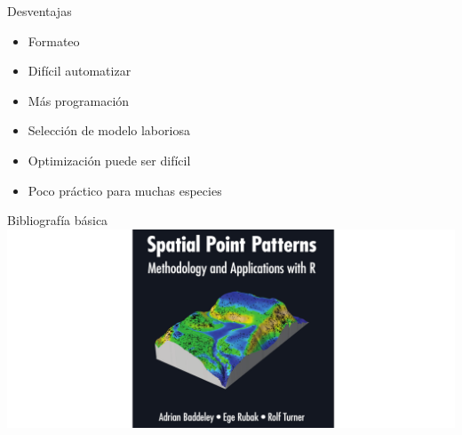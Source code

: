 \documentclass[
  11pt,
  ignorenonframetext,
]{beamer}
\providecommand{\tightlist}{%
  \setlength{\itemsep}{0pt}\setlength{\parskip}{0pt}}
\begin{document}
\begin{frame}{Desventajas}
\protect\hypertarget{desventajas}{}
\begin{itemize}
\tightlist
\item
  Formateo
\item
  Difícil automatizar
\item
  Más programación
\item
  Selección de modelo laboriosa
\item
  Optimización puede ser difícil
\item
  Poco práctico para muchas especies
\end{itemize}
\end{frame}

\begin{frame}{Bibliografía básica}
\protect\hypertarget{bibliografuxeda-buxe1sica}{}
\includegraphics{Figuras/Spat-book.png}
\end{frame}
\end{document}
